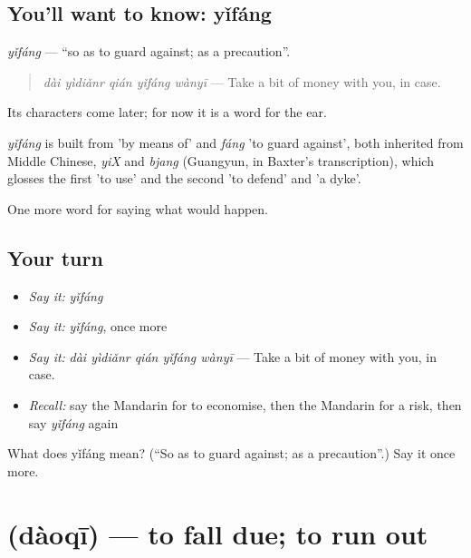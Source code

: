 \subsection*{You'll want to know: yǐfáng}
\emph{yǐfáng} — \textquotedblleft{}so as to guard against; as a precaution\textquotedblright{}.

\begin{quote}
\emph{dài yìdiǎnr qián yǐfáng wànyī} — Take a bit of money with you, in case.
\end{quote}

Its characters come later; for now it is a word for the ear.

\begin{cousinweb}
\emph{yǐfáng} is built from  'by means of' and \emph{fáng} 'to guard against', both inherited from Middle Chinese, \emph{yiX} and \emph{bjang} (Guangyun, in Baxter's transcription), which glosses the first 'to use' and the second 'to defend' and 'a dyke'.
\end{cousinweb}

\begin{grammarlens}[title={What you've built}]
One more word for saying what would happen.
\end{grammarlens}

\subsection*{Your turn}
\begin{itemize}
\raggedright
  \item \emph{Say it:} \emph{yǐfáng}
  \item \emph{Say it:} \emph{yǐfáng}, once more
  \item \emph{Say it:} \emph{dài yìdiǎnr qián yǐfáng wànyī} — Take a bit of money with you, in case.
  \item \emph{Recall:} say the Mandarin for to economise, then the Mandarin for a risk, then say \emph{yǐfáng} again
\end{itemize}

\begin{tcolorbox}[breakable,colback=teal!4,colframe=teal!35!black,title={Before you move on}]
What does yǐfáng mean? (\textquotedblleft{}So as to guard against; as a precaution\textquotedblright{}.) Say it once more.
\end{tcolorbox}
\section[\texorpdfstring{\zh{到期} (dàoqī)}{到期 (dàoqī)}]{ (dàoqī) — to fall due; to run out}

